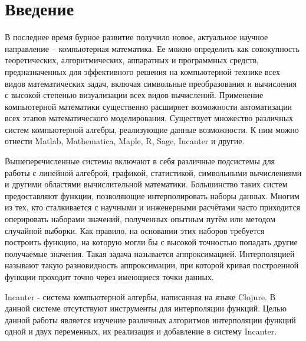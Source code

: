 \section{Введение}

В последнее время бурное развитие получило новое, актуальное научное направление – компьютерная математика. Ее можно определить как совокупность теоретических, алгоритмических, аппаратных и программных средств, предназначенных для эффективного решения на компьютерной технике всех видов математических задач, включая символьные преобразования и вычисления с высокой степенью визуализации всех видов вычислений. Применение компьютерной математики существенно расширяет возможности автоматизации всех этапов математического моделирования. Существует множество различных систем компьютерной алгебры, реализующие данные возможности. К ним можно отнести Matlab, Mathematica, Maple, R, Sage, Incanter и другие.

Вышеперечисленные системы включают в себя различные подсистемы для работы с линейной алгеброй, графикой, статистикой, символьными вычислениями и другими областями вычислительной математики. Большинство таких систем предоставляют функции, позволяющие интерполировать наборы данных. Многим из тех, кто сталкивается с научными и инженерными расчётами часто приходится оперировать наборами значений, полученных опытным путём или методом случайной выборки. Как правило, на основании этих наборов требуется построить функцию, на которую могли бы с высокой точностью попадать другие получаемые значения. Такая задача называется аппроксимацией. Интерполяцией называют такую разновидность аппроксимации, при которой кривая построенной функции проходит точно через имеющиеся точки данных.

Incanter - система компьютерной алгербы, написанная на языке Clojure. В данной системе отсутствуют инструменты для интерполяции функций. Целью данной работы является изучение различных алгоритмов интерполяции функций одной и двух переменных, их реализация и добавление в систему Incanter.

